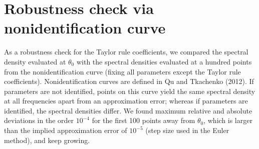 \documentclass{article}
\begin{document}
\section{Robustness check via nonidentification curve}
As a robustness check for the Taylor rule coefficients, we compared the spectral density evaluated at $\theta_0$ with the spectral densities evaluated at a hundred points from the nonidentification curve (fixing all parameters except the Taylor rule coefficients). Nonidentification curves are defined in Qu and Tkachenko (2012). If parameters are not identified, points on this curve yield the same spectral density at all frequencies apart from an approximation error; whereas if parameters are identified, the spectral densities differ. We found maximum relative and absolute deviations in the order $10^{-4}$ for the first 100 points away from $\theta_0$, which is larger than the implied approximation error of $10^{-5}$ (step size used in the Euler method), and keep growing.
\end{document}
